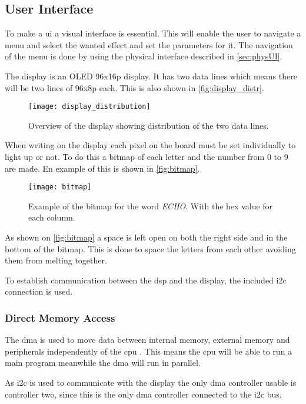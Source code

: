 \subsection{User Interface}
To make a \gls{ui} a visual interface is essential. This will enable the user to navigate a menu and select the wanted effect and set the parameters for it. The navigation of the menu is done by using the physical interface described in \autoref{sec:physUI}.

The display is an OLED 96x16p display. It has two data lines which means there will be two lines of 96x8p each. This is also shown in \autoref{fig:display_distr}.

\begin{figure}[htbp]
	\centering
	\texttt{[image: display\_distribution]}
	\caption{Overview of the display showing distribution of the two data lines.}
	\label{fig:display_distr}
\end{figure}

When writing on the display each pixel on the board must be set individually to light up or not. To do this a bitmap of each letter and the number from 0 to 9 are made. En example of this is shown in \autoref{fig:bitmap}.

\begin{figure}[htbp]
	\centering
	\texttt{[image: bitmap]}
	\caption{Example of the bitmap for the word \textit{ECHO}. With the hex value for each column.}
	\label{fig:bitmap}
\end{figure}

As shown on \autoref{fig:bitmap} a space is left open on both the right side and in the bottom of the bitmap. This is done to space the letters from each other avoiding them from melting together.

To establish communication between the \gls{dsp} and the display, the included \gls{i2c} connection is used.

\subsubsection{Direct Memory Access}
The \gls{dma} is used to move data between internal memory, external memory and peripherals independently of the \gls{cpu} \citep{dsp_dma}. This means the \gls{cpu} will be able to run a main program meanwhile the \gls{dma} will run in parallel.

As \gls{i2c} is used to communicate with the display the only \gls{dma} controller usable is controller two, since this is the only \gls{dma} controller connected to the \gls{i2c} bus\citep{dsp_dma}.

